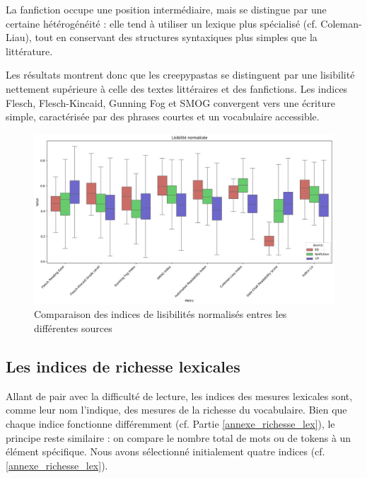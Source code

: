 \documentclass[12pt,a4paper,oneside,titlepage]{book} %
\begin{document}
La fanfiction occupe une position intermédiaire, mais se distingue par une certaine hétérogénéité : elle tend à utiliser un lexique plus spécialisé (cf. Coleman-Liau), tout en conservant des structures syntaxiques plus simples que la littérature. 

Les résultats montrent donc que les creepypastas se distinguent par une lisibilité nettement supérieure à celle des textes littéraires et des fanfictions. Les indices Flesch, Flesch-Kincaid, Gunning Fog et SMOG convergent vers une écriture simple, caractérisée par des phrases courtes et un vocabulaire accessible. 

    
		
	\begin{figure}
		\centering
		\includegraphics[scale=0.45]{illustration/readabiliy_norm.png}
		\caption{Comparaison des indices de lisibilités normalisés entres les différentes sources}
		\label{fig:comparaison_readability}
	\end{figure}
	
\pagebreak
	
	
\subsection{Les indices de richesse lexicales}

Allant de pair avec la difficulté de lecture, les indices des mesures lexicales sont, comme leur nom l'indique, des mesures de la richesse du vocabulaire. Bien que chaque indice fonctionne différemment (cf. Partie \ref{annexe_richesse_lex}), le principe reste similaire : on compare le nombre total de mots ou de tokens à un élément spécifique. Nous avons sélectionné initialement quatre indices (cf. \ref{annexe_richesse_lex}).
\end{document}
